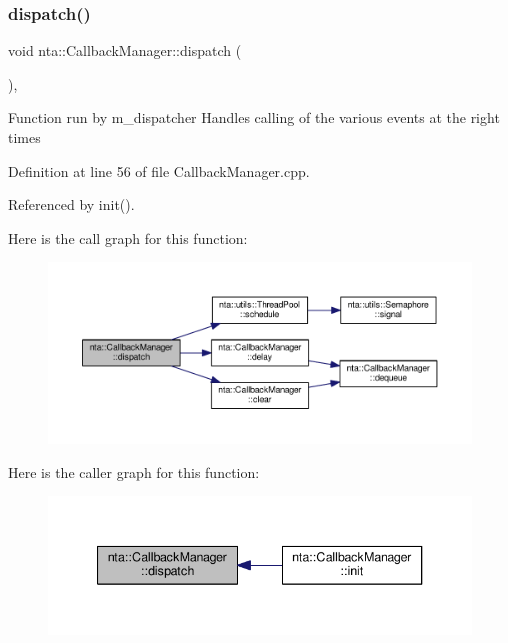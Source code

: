 \subsubsection{\texorpdfstring{dispatch()}{dispatch()}}
{\footnotesize\ttfamily void nta\+::\+Callback\+Manager\+::dispatch (\begin{DoxyParamCaption}{ }\end{DoxyParamCaption})\hspace{0.3cm}{\ttfamily [static]}, {\ttfamily [private]}}

Function run by m\+\_\+dispatcher Handles calling of the various events at the right times 

Definition at line 56 of file Callback\+Manager.\+cpp.



Referenced by init().

Here is the call graph for this function\+:\nopagebreak
\begin{figure}[H]
\begin{center}
\leavevmode
\includegraphics[width=350pt]{d1/de6/classnta_1_1CallbackManager_a7912dc908d7a7a44267ddd8fa6fb8686_cgraph}
\end{center}
\end{figure}
Here is the caller graph for this function\+:\nopagebreak
\begin{figure}[H]
\begin{center}
\leavevmode
\includegraphics[width=340pt]{d1/de6/classnta_1_1CallbackManager_a7912dc908d7a7a44267ddd8fa6fb8686_icgraph}
\end{center}
\end{figure}
\mbox{\label{classnta_1_1CallbackManager_a1fd6132e79e49dbcb787bc8a8507a931}} 
